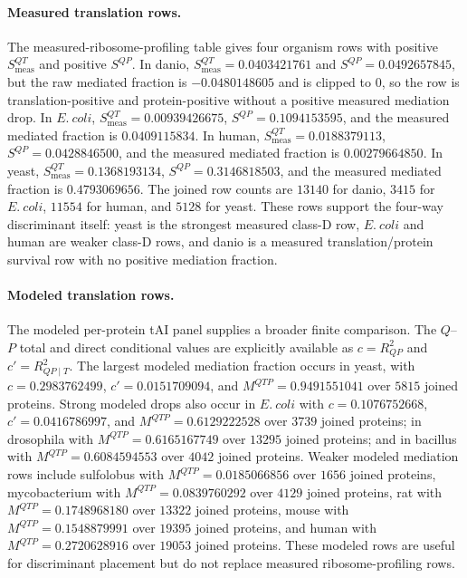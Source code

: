 \paragraph{Measured translation rows.}
The measured-ribosome-profiling table gives four organism rows with positive $S^{QT}_{\mathrm{meas}}$ and positive $S^{QP}$. In danio, $S^{QT}_{\mathrm{meas}}=0.0403421761$ and $S^{QP}=0.0492657845$, but the raw mediated fraction is $-0.0480148605$ and is clipped to $0$, so the row is translation-positive and protein-positive without a positive measured mediation drop. In $E.\ coli$, $S^{QT}_{\mathrm{meas}}=0.00939426675$, $S^{QP}=0.1094153595$, and the measured mediated fraction is $0.0409115834$. In human, $S^{QT}_{\mathrm{meas}}=0.0188379113$, $S^{QP}=0.0428846500$, and the measured mediated fraction is $0.00279664850$. In yeast, $S^{QT}_{\mathrm{meas}}=0.1368193134$, $S^{QP}=0.3146818503$, and the measured mediated fraction is $0.4793069656$. The joined row counts are $13140$ for danio, $3415$ for $E.\ coli$, $11554$ for human, and $5128$ for yeast. These rows support the four-way discriminant itself: yeast is the strongest measured class-D row, $E.\ coli$ and human are weaker class-D rows, and danio is a measured translation/protein survival row with no positive mediation fraction.

\paragraph{Modeled translation rows.}
The modeled per-protein tAI panel supplies a broader finite comparison. The $Q$--$P$ total and direct conditional values are explicitly available as $c=R^2_{QP}$ and $c'=R^2_{QP\mid T}$. The largest modeled mediation fraction occurs in yeast, with $c=0.2983762499$, $c'=0.0151709094$, and $M^{QTP}=0.9491551041$ over $5815$ joined proteins. Strong modeled drops also occur in $E.\ coli$ with $c=0.1076752668$, $c'=0.0416786997$, and $M^{QTP}=0.6129222528$ over $3739$ joined proteins; in drosophila with $M^{QTP}=0.6165167749$ over $13295$ joined proteins; and in bacillus with $M^{QTP}=0.6084594553$ over $4042$ joined proteins. Weaker modeled mediation rows include sulfolobus with $M^{QTP}=0.0185066856$ over $1656$ joined proteins, mycobacterium with $M^{QTP}=0.0839760292$ over $4129$ joined proteins, rat with $M^{QTP}=0.1748968180$ over $13322$ joined proteins, mouse with $M^{QTP}=0.1548879991$ over $19395$ joined proteins, and human with $M^{QTP}=0.2720628916$ over $19053$ joined proteins. These modeled rows are useful for discriminant placement but do not replace measured ribosome-profiling rows.

